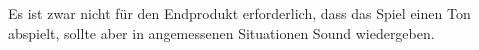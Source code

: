 Es ist zwar nicht für den Endprodukt erforderlich, dass das Spiel einen Ton abspielt, \gls{sollte} aber in angemessenen Situationen Sound wiedergeben.